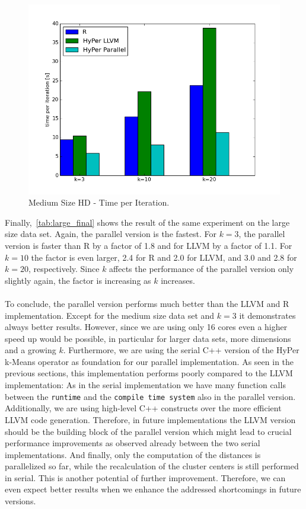 \begin{figure}[htsb]
  \centering
  \includegraphics[scale=0.5, trim="0cm 1.5cm 0cm 0cm"]{figures/charts/15Mxhd_final}
  \caption[Medium Size HD - Time per Iteration]{Medium Size HD - Time per Iteration.}
  \label{fig:final_15_hd}
\end{figure}

Finally,~\autoref{tab:large_final} shows the result of the same experiment on the large size data set. Again, the parallel version is the fastest. For $k = 3$, the parallel version is faster than R by a factor of 1.8 and for LLVM by a factor of 1.1. For $k = 10$ the factor is even larger, 2.4 for R and 2.0 for LLVM, and 3.0 and 2.8 for $k = 20$, respectively. Since $k$ affects the performance of the parallel version only slightly again, the factor is increasing as $k$ increases.
\\
\\
To conclude, the parallel version performs much better than the LLVM and R implementation. Except for the medium size data set and $k = 3$ it demonstrates always better results. However, since we are using only 16 cores even a higher speed up would be possible, in particular for larger data sets, more dimensions and a growing $k$. Furthermore, we are using the serial C++ version of the HyPer k-Means operator as foundation for our parallel implementation. As seen in the previous sections, this implementation performs poorly compared to the LLVM implementation: As in the serial implementation we have many function calls between the \texttt{runtime} and the \texttt{compile time system} also in the parallel version. Additionally, we are using high-level C++ constructs over the more efficient LLVM code generation. Therefore, in future implementations the LLVM version should be the building block of the parallel version which might lead to crucial performance improvements as observed already between the two serial implementations. And finally, only the computation of the distances is parallelized so far, while the recalculation of the cluster centers is still performed in serial. This is another potential of further improvement. Therefore, we can even expect better results when we enhance the addressed shortcomings in future versions.



